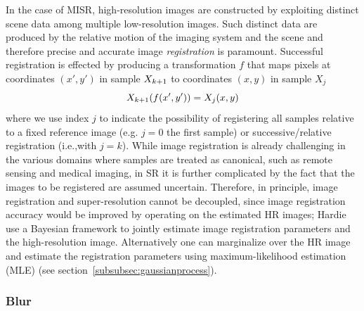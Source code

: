 In the case of MISR, high-resolution images are constructed by exploiting distinct scene data among multiple low-resolution images.
%
Such distinct data are produced by the relative motion of the imaging system and the scene and therefore precise and accurate image \textit{registration} is paramount.
%
Successful registration is effected by producing a transformation \(f\) that maps pixels at coordinates \((x',y')\) in sample \(X_{k+1}\) to coordinates \((x,y)\) in sample \(X_j\)
\begin{equation}
	X_{k+1}(f(x', y')) = X_j(x,y)
	\label{eqn:registration}
\end{equation}
where we use index \(j\) to indicate the possibility of registering all samples relative to a fixed reference image (e.g. \(j=0\) the first sample) or successive/relative registration (i.e.,with \(j=k\)).
%
While image registration is already challenging in the various domains where samples are treated as canonical, such as remote sensing and medical imaging, in SR it is further complicated by the fact that the images to be registered are assumed uncertain.
%
Therefore, in principle, image registration and super-resolution cannot be decoupled, since image registration accuracy would be improved by operating on the estimated HR images;
%
Hardie \etal\cite{Hardie1997} use a Bayesian framework to jointly estimate image registration parameters and the high-resolution image\cite{Hardie1997}.
%
Alternatively one can marginalize over the HR image and estimate the registration parameters using maximum-likelihood estimation (MLE) (see section~\ref{subsubsec:gaussianprocess}).

\subsubsection{Blur}

